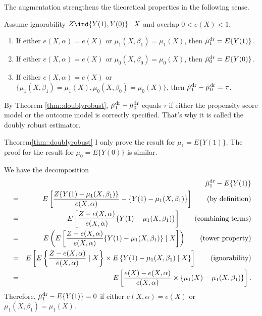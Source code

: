 The augmentation strengthens the theoretical properties in the following sense.   
 
 


\begin{theorem}
\label{thm::doublyrobust}
Assume ignorability $Z \ind  \{  Y(1), Y(0) \} \mid X$ and overlap $0 < e(X) < 1$. 
\begin{enumerate}
\item
If either $e(X,\alpha) = e(X)$ or $\mu_1(X, \beta_1) = \mu_1(X)$, then $\tilde{\mu}_1^\textup{dr} = E\{  Y(1) \}$.
\item 
If either $e(X,\alpha) = e(X)$ or $\mu_0(X, \beta_0) = \mu_0(X)$, then $\tilde{\mu}_0^\textup{dr} = E\{  Y(0) \}$.
\item 
If either $e(X,\alpha) = e(X)$ or $\{\mu_1(X, \beta_1) = \mu_1(X),   \mu_0(X, \beta_0) = \mu_0(X)\}$, then $\tilde{\mu}_1^\textup{dr} - \tilde{\mu}_0^\textup{dr} = \tau$. 
\end{enumerate}
\end{theorem}


By Theorem \ref{thm::doublyrobust}, $\tilde{\mu}_1^\textup{dr} - \tilde{\mu}_0^\textup{dr} $ equals $\tau$ if either the propensity score model or the outcome model is correctly specified. That's why it is called the doubly robust estimator.  


\begin{myproof}{Theorem}{\ref{thm::doublyrobust}}
I only prove the result for $\mu_1 = E\{  Y(1) \}$. The proof for the result for $\mu_0 = E\{  Y(0) \}$ is similar. 


We have the decomposition
\begin{eqnarray*}
&&\tilde{\mu}_1^\textup{dr} - E\{  Y(1) \}     \\
&=& E\left[   \frac{Z\{ Y(1)-\mu_1(X,\beta_1) \}}{  e(X,\alpha) }   - \{ Y(1) -  \mu_1(X, \beta_1) \} \right]  
\qquad (\text{by definition})\\
&=&    E\left[   \frac{Z - e(X,\alpha) }{  e(X,\alpha) }   \{ Y(1) -  \mu_1(X, \beta_1) \} \right]  
\qquad (\text{combining terms})\\
&=&  E\left(  E\left[   \frac{Z - e(X,\alpha) }{  e(X,\alpha) }   \{ Y(1) -  \mu_1(X, \beta_1) \} \mid X \right] \right) 
\qquad (\text{tower property})\\
&=& E\left[  E\left\{   \frac{Z - e(X,\alpha) }{  e(X,\alpha) } \mid X \right\} \times E\left\{  Y(1) -  \mu_1(X, \beta_1)  \mid X \right\} \right] 
\qquad (\text{ignorability})\\
&=& E\left[   \frac{e(X) - e(X,\alpha) }{  e(X,\alpha) }  \times  \left\{  \mu_1(X) -  \mu_1(X, \beta_1)   \right\} \right]  . 
\end{eqnarray*}
Therefore, $\tilde{\mu}_1^\textup{dr} - E\{  Y(1) \}  = 0$
 if either $e(X,\alpha) = e(X)$ or $\mu_1(X, \beta_1) = \mu_1(X)$. 
\end{myproof}



